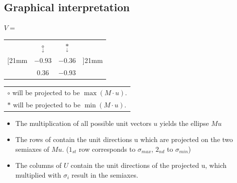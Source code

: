 \documentclass[10pt,a4paper]{scrartcl}
\begin{document}
\begin{multicols*}{3}
	\vspace*{\fill}
	
	\columnbreak
	
	
	\subsection*{Graphical interpretation}
	
	$V=$
	\footnotesize
	\begin{tabular}{rccl}
	&$\underset{\downarrow}{\circ}$&$\underset{\downarrow}{\ast}$\\
	\ldelim[{2}{1mm}&$-0.93$&$-0.36$&\rdelim]{2}{1mm}\\
	&$0.36$&$-0.93$&
	\end{tabular}
	\begin{tabular}{l}
	\\
	$\circ$ will be projected to be $\max(M\cdot u)$.\\
	$\ast$ will be projected to be $\min(M\cdot u)$.
	\end{tabular}
	\normalsize
	
		
	
	\begin{itemize}
	\compaq
	\item
	The multiplication of all possible unit vectors $u$ yields the ellipse $Mu$
	\item
	The rows of  contain the unit directions u which are projected on the two semiaxes of $Mu$. ($1_{st}$ row corresponds to $\sigma_{max}$, $2_{nd}$ to $\sigma_{min}$)
	\item
	The columns of $U$ contain the unit directions of the projected u, which multiplied with $\sigma_i$ result in the semiaxes.
	\end{itemize}
	

\end{multicols*}
\end{document}
